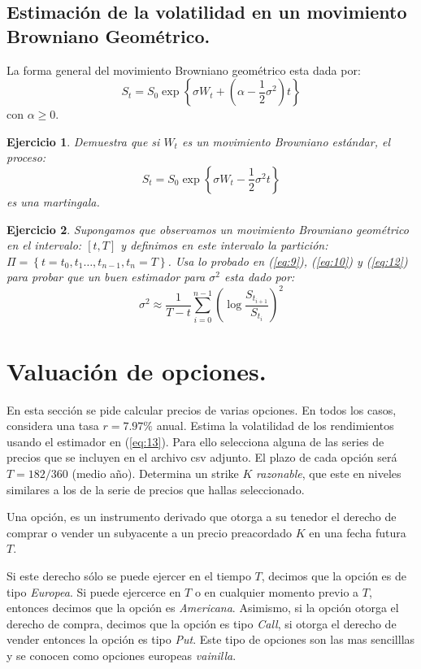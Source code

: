 \documentclass{article}
\newtheorem{ejercicio}{Ejercicio}
\begin{document}
\subsection{Estimación de la volatilidad en un movimiento Browniano Geométrico.}
La forma general del movimiento Browniano geométrico esta dada por:
\begin{equation}
    S_t = S_0 \exp\left\{\sigma W_t + (\alpha-\frac{1}{2}\sigma^2)t \right\}
\end{equation}
con $\alpha \geq 0$.
\begin{ejercicio}
    Demuestra que si $W_t$ es un movimiento Browniano estándar, el proceso:
    $$
        S_t = S_0 \exp\left\{\sigma W_t -\frac{1}{2}\sigma^2t\right\} 
    $$
    es una martingala.
\end{ejercicio}
\begin{ejercicio}
    Supongamos que observamos un movimiento Browniano geométrico en el intervalo: $[t, T]$ y definimos en este intervalo la partición: $\Pi = \left\{t=t_0, t_1\ldots,t_{n-1}, t_n=T \right\}$. Usa lo probado en (\ref{eq:9}), (\ref{eq:10})  y (\ref{eq:12}) para probar que un buen estimador para $\sigma^2$ esta dado por:
\begin{equation}\label{eq:13}
    \sigma^2 \approx \frac{1}{T-t}\sum_{i=0}^{n-1}\left(\log\frac{S_{t_{i+1}}}{S_{t_i}}\right)^2
\end{equation}
\end{ejercicio}
\section{Valuación de opciones.}

En esta sección se pide calcular precios de varias opciones. En todos los casos, considera una tasa $r = 7.97\%$ anual. Estima la volatilidad de los rendimientos usando el estimador en (\ref{eq:13}). Para ello selecciona alguna de las series de precios que se incluyen en el archivo csv adjunto. El plazo de cada opción será $T = 182/360$ (medio año). Determina un strike $K$ \emph{razonable}, que este en niveles similares a los de la serie de precios que hallas seleccionado. 

Una opción, es un instrumento derivado  que otorga a su tenedor el derecho de comprar o vender un subyacente a un precio preacordado $K$ en una fecha futura $T$.

Si este derecho sólo se puede ejercer en el tiempo $T$, decimos que la opción es de tipo \emph{Europea}. Si puede ejercerce en $T$ o en cualquier momento previo a $T$, entonces decimos que la opción es \emph{Americana}. Asimismo, si la opción otorga el derecho de compra, decimos que la opción es tipo \emph{Call}, si otorga el derecho de vender entonces la opción es tipo \emph{Put}. Este tipo de opciones son las mas sencilllas y se conocen como opciones europeas \emph{vainilla}.
\end{document}
